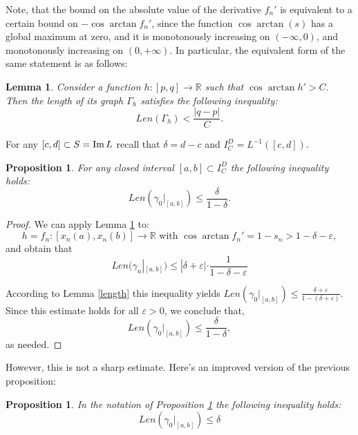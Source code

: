 \documentclass{article}
\newtheorem{lemma}[theorem]{Lemma}
\newtheorem{prop}[theorem]{Proposition}
\theoremstyle{definition}
\newcommand{\lt}{\left}
\newcommand{\rt}{\right}
\newcommand{\R}{{\mathbb R}}
\newcommand{\im}{\mathop{\rm Im}\nolimits}
\newcommand{\Le}{\leqslant}
\newcommand{\veps}{\varepsilon}
\newcommand{\Inf}{\infty}
\begin{document}
    Note, that the bound on the absolute value of the derivative $f_n'$ is equivalent to a certain bound on $-\cos\arctan f_n'$, since the function $\cos\arctan(s)$ has a global maximum at zero, and it is monotonously increasing on $(-\Inf, 0)$, and monotonously increasing on $(0, +\Inf)$. In particular, the equivalent form of the same statement is as follows:
    \begin{lemma}
    \label{impr-length-est}
        Consider a function $h\colon [p, q] \to \R$ such that $\cos\arctan h' > C$. Then the length of its graph $\Gamma_h$ satisfies the following inequality:
        $$
        Len(\Gamma_h) < \frac{|q-p|}{C}.
        $$
    \end{lemma}

    For any $[c, d]\subset S = \im L$ recall that $\delta = d - c$ and $I_C^D = L^{-1}([c, d])$.
    \begin{prop}
    \label{est1}
        For any closed interval $[a, b]\subset I_C^D$ the following inequality holds:
        $$
        Len\lt(\gamma_0|_{[a, b]}\rt) \Le \frac{\delta}{1 - \delta}.
        $$
    \end{prop}
    
    \begin{proof}[Proof]
        We can apply Lemma \ref{impr-length-est} to: 
        $$
        h = f_n\colon [x_n(a), x_n(b)]\to\R \,\,\text{with}\,\, \cos{\arctan{f_n'}} = 1 - s_n > 1 - \delta - \veps,
        $$
        and obtain that 
        $$
        Len(\gamma_n|_{[a, b]})\Le |\delta + \veps|\cdot \frac{1}{1 - \delta - \veps}
        $$
    
        According to Lemma \ref{length} this inequality yields $Len(\gamma_0|_{[a, b]}) \Le \frac{\delta + \veps}{1 - (\delta + \veps)}$. Since this estimate holds for all $\veps > 0$, we conclude that,
        $$
        Len(\gamma_0|_{[a, b]}) \Le \frac{\delta}{1 - \delta},
        $$
        as needed.
    \end{proof}
    
    However, this is not a sharp estimate. Here's an improved version of the previous proposition:
    
    \begin{prop}
    \label{est2}
        In the notation of Proposition \ref{est1} the following inequality holds:
        $$
        Len\lt(\gamma_0|_{[a, b]}\rt) \Le \delta
        $$
    \end{prop}
    
\end{document}
